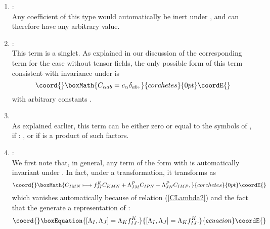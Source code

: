 \documentclass[a4paper,11pt]{article}
\begin{document}
\begin{enumerate}
\item {}\coordHE{}:\\
Any coefficient of this type would automatically be inert under \coordHE{}, and
can therefore have any arbitrary value.
\item {}\coordHE{}:\\
This term is a \coordHE{} singlet. As explained in our discussion of
the corresponding term for the case without tensor fields, the
only possible form of this term consistent with invariance under
\coordHE{} is
\begin{displaymath}\coord{}\boxMath{
C_{\alpha ab}=c_{\alpha}\delta_{ab},
}{corchetes}{0pt}\coordE{}\end{displaymath}
with arbitrary constants \coordHE{}.

\item {}\coordHE{}\\
As explained earlier, this term can be either zero or equal to the
\coordHE{} symbols of \coordHE{}, if \coordHE{}: \coordHE{}, or if \coordHE{} is a
product of such \coordHE{} factors.

\item {}\coordHE{}:\\
We first note that, in general,
any term of the form \coordHE{} with \coordHE{}
is automatically invariant under \coordHE{}. In fact, under a \coordHE{}
transformation, it transforms as
\begin{displaymath}\coord{}\boxMath{
C_{IMN}\longmapsto
f_{JI}^{K}C_{KMN}+\Lambda_{JM}^{P}C_{IPN}+\Lambda_{JN}^{P}C_{IMP},
}{corchetes}{0pt}\coordE{}\end{displaymath}
which vanishes automatically because of relation (\ref{CLambda2})
and the fact that the \coordHE{} generate a representation
of \coordHE{}:
\begin{equation}\coord{}\boxEquation{\label{commutator}
[\Lambda_{I},\Lambda_{J}]=\Lambda_{K}f_{IJ}^{K}.
}{[\Lambda_{I},\Lambda_{J}]=\Lambda_{K}f_{IJ}^{K}.
}{ecuacion}\coordE{}\end{equation}


\end{enumerate}
\end{document}
